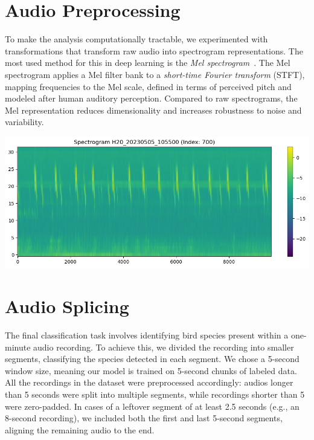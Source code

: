 \documentclass[11pt]{article}
\begin{document}
\section*{Audio Preprocessing}

\begin{minipage}{0.48\linewidth}
  To make the analysis computationally tractable, we experimented with transformations that transform raw audio into spectrogram representations. The most used method for this in deep learning is the \emph{Mel spectrogram}~\cite{mel_cepstrum}. The Mel spectrogram applies a Mel filter bank to a \emph{short-time Fourier transform} (STFT), mapping frequencies to the Mel scale, defined in terms of perceived pitch and modeled after human auditory perception. Compared to raw spectrograms, the Mel representation reduces dimensionality and increases robustness to noise and variability.
\end{minipage}
\hfill
\begin{minipage}{0.48\linewidth}
  \includegraphics[width=\linewidth]{img/scape_spectrogram.png}
\end{minipage}

\section*{Audio Splicing}

The final classification task involves identifying bird species present within a one-minute audio recording. To achieve this, we divided the recording into smaller segments, classifying the species detected in each segment. We chose a 5-second window size, meaning our model is trained on 5-second chunks of labeled data. All the recordings in the dataset were preprocessed accordingly: audios longer than 5 seconds were split into multiple segments, while recordings shorter than 5 were zero-padded. In cases of a leftover segment of at least 2.5 seconds (e.g., an 8-second recording), we included both the first and last 5-second segments, aligning the remaining audio to the end.
\end{document}
